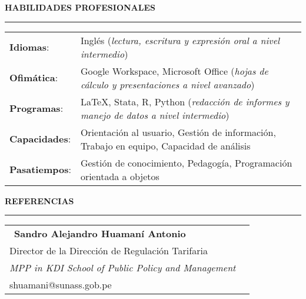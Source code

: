\documentclass{resume2}
\begin{document}



{\color{vino} \noindent\MakeUppercase{\large \bf Habilidades profesionales} \\
\rule[3mm]{\textwidth}{0.5mm}}

\vspace{-3mm}

\begin{table}[H]
	\begin{tabular}{ll}
		{\bf Idiomas}: & Inglés ({\it lectura, escritura y expresión oral a nivel intermedio}) \\
		{\bf Ofimática}: & Google Workspace, Microsoft Office ({\it hojas de cálculo y presentaciones a nivel avanzado}) \\
		{\bf Programas}: & \LaTeX, Stata, R, Python ({\it redacción de informes y manejo de datos a nivel intermedio}) \\
		{\bf Capacidades}: & Orientación al usuario, Gestión de información, Trabajo en equipo, Capacidad de análisis \\
		{\bf Pasatiempos}: & Gestión de conocimiento, Pedagogía, Programación orientada a objetos
	\end{tabular}
\end{table}

{\color{vino} \noindent\MakeUppercase{\large \bf Referencias} \\
\rule[3mm]{\textwidth}{0.5mm}}

\vspace{-3mm}

\begin{table}[H]
	\begin{tabular}{ll}
		{\color{vino}\faUser} \, {\bf Sandro Alejandro Huamaní Antonio} &  \\
		{Director de la Dirección de Regulación Tarifaria} & \\
		{\it MPP in KDI School of Public Policy and Management} & \\
		{shuamani@sunass.gob.pe} & 
	\end{tabular}
\end{table}

\begin{multicols}{2}
	
	
	
\end{multicols}
\end{document}
